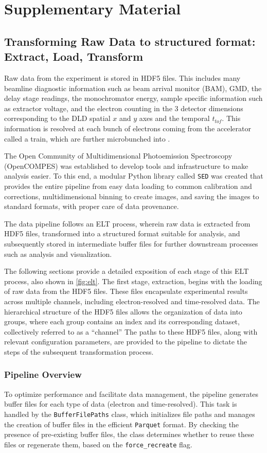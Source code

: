 \chapter{Supplementary Material}
\section{Transforming Raw Data to structured format: Extract, Load, Transform}\label{sec:elt}
Raw data from the experiment is stored in HDF5 files. This includes many \gls{beamline} diagnostic information such as beam arrival monitor (BAM), \gls{GMD}, the delay stage readings, the monochromator energy, sample specific information such as extractor voltage, and the electron counting in the 3 detector dimensions corresponding to the \gls{DLD} spatial $x$ and $y$ axes and the temporal $t_{tof}$. This information is resolved at each bunch of electrons coming from the accelerator called a \gls{train}, which are further microbunched into .

The Open Community of Multidimensional Photoemission Spectroscopy (OpenCOMPES) was established to develop tools and infrastructure to make analysis easier. To this end, a modular Python library called \texttt{SED} was created that provides the entire pipeline from easy data loading to common calibration and corrections, multidimensional binning to create images, and saving the images to standard formats, with proper care of data provenance.

The data pipeline follows an \gls{ELT} process, wherein raw data is extracted from HDF5 files, transformed into a structured format suitable for analysis, and subsequently stored in intermediate buffer files for further downstream processes such as analysis and visualization.

The following sections provide a detailed exposition of each stage of this \gls{ELT} process, also shown in \cref{fig:elt}. The first stage, extraction, begins with the loading of raw data from the HDF5 files. These files encapsulate experimental results across multiple channels, including electron-resolved and time-resolved data. The hierarchical structure of the HDF5 files allows the organization of data into groups, where each group contains an index and its corresponding dataset, collectively referred to as a “channel” The paths to these HDF5 files, along with relevant configuration parameters, are provided to the pipeline to dictate the steps of the subsequent transformation process.

\subsection*{Pipeline Overview}
To optimize performance and facilitate data management, the pipeline generates buffer files for each type of data (electron and time-resolved). This task is handled by the \texttt{BufferFilePaths} class, which initializes file paths and manages the creation of buffer files in the efficient \texttt{Parquet} format. By checking the presence of pre-existing buffer files, the class determines whether to reuse these files or regenerate them, based on the \texttt{force\_recreate} flag.

